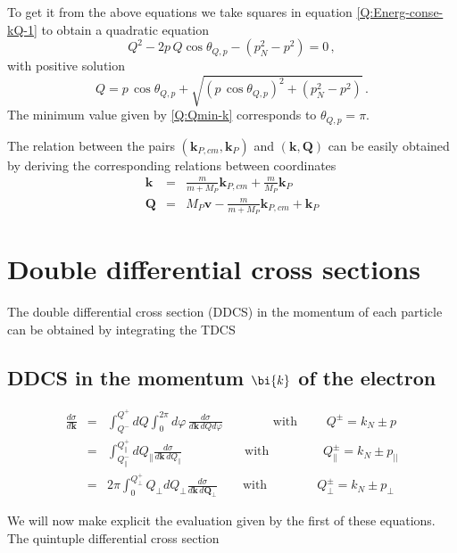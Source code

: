 \noindent To get it from the above equations we take squares in
equation \ref{Q:Energ-conse-kQ-1} to obtain a quadratic equation
$$
Q^{2} - 2 p\, Q \cos{\theta_{Q,p}} - \left( p_{N}^{2} - p^{2} \right) =
0 \, ,
$$
with positive solution
$$
Q = p\, \cos{\theta_{Q,p}} + \sqrt{(p\, \cos{\theta_{Q,p}})^{2} +
\left( p_{N}^{2} - p^{2} \right)} \, .
$$
%
The minimum value  given by \ref{Q:Qmin-k} corresponds to
$\theta_{Q,p}=\pi$.

The relation between the pairs $(\bm{k}_{P,cm}, \bm{k}_{P})$ and $(\bm{k},
\bm{Q})$ can be easily obtained by deriving the corresponding relations between
coordinates
\begin{eqnarray*}
  \bm{k}&=& \frac{m}{m+ M_{P}}\bm{k}_{P,cm} + \frac{m}{M_{P}}\bm{k}_{P} \\
  \bm{Q}&=& M_{P} \bm{v} - \frac{m}{m+ M_{P}}\bm{k}_{P,cm} + \bm{k}_{P}
\end{eqnarray*}


\section{Double differential cross sections}

The double differential cross section (DDCS) in the momentum of each
particle can be obtained by integrating the TDCS


\subsection{DDCS in the momentum $\bi{k}$ of the electron}

\begin{eqnarray*}
\frac{d \sigma}{d \bm{k}} &=& \int_{Q^{-}}^{Q^{+}} d Q
\int_{0}^{2 \pi} d \varphi \, \frac{d\sigma}{d \bm{k} \, d
Q d \varphi} \qquad  \qquad \mbox{with } \qquad Q^{\pm}= k_{N} {\pm} p
\\
&=& \int_{Q_{\parallel }^{-}}^{Q_{\parallel }^{+}} d Q_{\parallel
} \frac{d\sigma}{d \bm{k} \, d Q_{\parallel }}  \qquad \quad
\qquad \mbox{with }  \qquad \qquad Q^{\pm}_{\parallel } = k_{N} {\pm} p_{|
| }
\\
&=& 2 \pi \int_{0}^{Q_{\perp}^{+}} Q_{\perp} d Q_{\perp}
\frac{d\sigma}{d \bm{k} \, d \bm{Q}_{\perp}} \qquad \mbox{with
} \qquad\qquad Q_{\perp}^{\pm}= k_{N} {\pm} p_{\perp}
\end{eqnarray*}

We will now make explicit the evaluation given by the first of these
equations. The quintuple differential cross section


